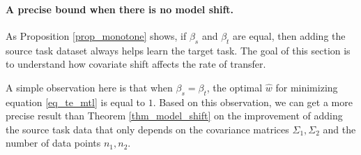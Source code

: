\paragraph{A precise bound when there is no model shift.}
As Proposition \ref{prop_monotone} shows, if $\beta_s$ and $\beta_t$ are equal, then adding the source task dataset always helps learn the target task.
The goal of this section is to understand how covariate shift affects the rate of transfer. 


A simple observation here is that when $\beta_s = \beta_t$, the optimal $\hat{w}$ for minimizing equation \eqref{eq_te_mtl} is equal to $1$.
Based on this observation, we can get a more precise result than Theorem \ref{thm_model_shift} on the improvement of adding the source task data that only depends on the covariance matrices $\Sigma_1, \Sigma_2$ and the number of data points $n_1, n_2$.



